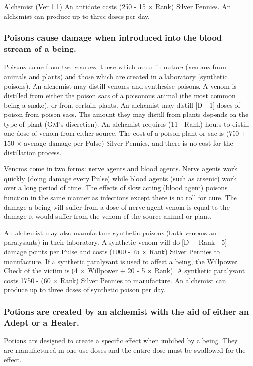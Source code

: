 \begin{Chapter}{Alchemist (Ver 1.1)}
An antidote costs (250 - 15 × Rank) Silver Pennies.  An alchemist can
produce up to three doses per day.

\subsubsection{Poisons cause damage when introduced into the 
blood stream of a being.}

Poisons come from two sources: those which occur in nature (venoms
from animals and plants) and those which are created in a laboratory
(synthetic poisons).  An alchemist may distill venoms and synthesise
poisons.  A venom is distilled from either the poison sacs of a
poisonous animal (the most common being a snake), or from certain
plants.  An alchemist may distill [D - 1] doses of poison from poison
sacs.  The amount they may distill from plants depends on the type of
plant (GM’s discretion).  An alchemist requires (11 - Rank) hours to
distill one dose of venom from either source.  The cost of a poison
plant or sac is (750 + 150 × average damage per Pulse) Silver Pennies,
and there is no cost for the distillation process.

Venoms come in two forms: nerve agents and blood agents.  Nerve agents
work quickly (doing damage every Pulse) while blood agents (such as
arsenic) work over a long period of time.  The effects of slow acting
(blood agent) poisons function in the same manner as infections except
there is no roll for cure. The damage a being will suffer from a dose
of nerve agent venom is equal to the damage it would suffer from the
venom of the source animal or plant.

An alchemist may also manufacture synthetic poisons (both venoms and
paralysants) in their laboratory. A synthetic venom will do [D + Rank
  - 5] damage points per Pulse and costs (1000 - 75 × Rank) Silver
Pennies to manufacture. If a synthetic paralysant is used to affect a
being, the Willpower Check of the victim is (4 × Willpower + 20 - 5 ×
Rank).  A synthetic paralysant costs 1750 - (60 × Rank) Silver Pennies
to manufacture. An alchemist can produce up to three doses of
synthetic poison per day.

\subsubsection{Potions are created by an alchemist with the aid of either an Adept or
a Healer.}

Potions are designed to create a specific effect when imbibed by a
being.  They are manufactured in one-use doses and the entire dose
must be swallowed for the effect.


\end{Chapter}
